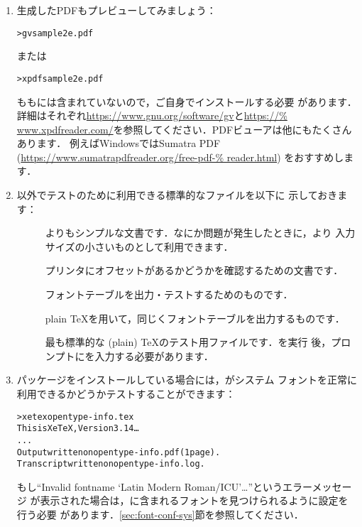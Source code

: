 \documentclass[uplatex,dvipdfmx,tombow]{jsarticle}
\begin{document}
\begin{enumerate}
\item 生成したPDFもプレビューしてみましょう：
%
\begin{alltt}
> gv sample2e.pdf
\end{alltt}
%
または
%
\begin{alltt}
> xpdf sample2e.pdf
\end{alltt}
%
もも\TL には含まれていないので，ご自身でインストールする必要
があります．詳細はそれぞれ\url{https://www.gnu.org/software/gv}と\url{https://%
www.xpdfreader.com/}を参照してください．PDFビューアは他にもたくさんあります．
例えばWindowsではSumatra PDF (\url{https://www.sumatrapdfreader.org/free-pdf-%
reader.html}) をおすすめします．

\item {}以外でテストのために利用できる標準的なファイルを以下に
示しておきます：
%
\begin{description}
\item []
よりもシンプルな文書です．なにか問題が発生したときに，より
入力サイズの小さいものとして利用できます．

\item []
プリンタにオフセットがあるかどうかを確認するための文書です．

\item []
フォントテーブルを出力・テストするためのものです．

\item []
plain \TeX を用いて，同じくフォントテーブルを出力するものです．

\item []
最も標準的な (plain) \TeX のテスト用ファイルです．を実行
後，\code{*}プロンプトにを入力する必要があります．
\end{description}

\item {}パッケージをインストールしている場合には，\XeTeX がシステム
フォントを正常に利用できるかどうかテストすることができます：
%
\begin{alltt}
> xetex opentype-info.tex
This is XeTeX, Version 3.14\dots
...
Output written on opentype-info.pdf (1 page).
Transcript written on opentype-info.log.
\end{alltt}
%
もし``Invalid fontname `Latin Modern Roman/ICU'\dots''というエラーメッセージ
が表示された場合は，\TL に含まれるフォントを見つけられるように設定を行う必要
があります．\ref{sec:font-conf-sys}節を参照してください．
\end{enumerate}
\end{document}
